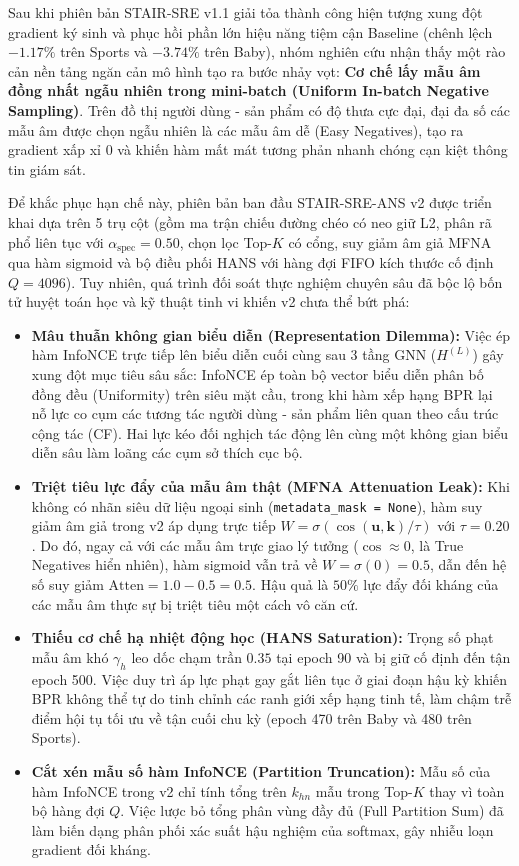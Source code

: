 Sau khi phiên bản STAIR-SRE v1.1 giải tỏa thành công hiện tượng xung đột gradient ký sinh và phục hồi phần lớn hiệu năng tiệm cận Baseline (chênh lệch $-1.17\%$ trên Sports và $-3.74\%$ trên Baby), nhóm nghiên cứu nhận thấy một rào cản nền tảng ngăn cản mô hình tạo ra bước nhảy vọt: \textbf{Cơ chế lấy mẫu âm đồng nhất ngẫu nhiên trong mini-batch (Uniform In-batch Negative Sampling)}. Trên đồ thị người dùng - sản phẩm có độ thưa cực đại, đại đa số các mẫu âm được chọn ngẫu nhiên là các mẫu âm dễ (Easy Negatives), tạo ra gradient xấp xỉ 0 và khiến hàm mất mát tương phản nhanh chóng cạn kiệt thông tin giám sát.

Để khắc phục hạn chế này, phiên bản ban đầu STAIR-SRE-ANS v2 được triển khai dựa trên 5 trụ cột (gồm ma trận chiếu đường chéo có neo giữ L2, phân rã phổ liên tục với $\alpha_{\text{spec}} = 0.50$, chọn lọc Top-$K$ có cổng, suy giảm âm giả MFNA qua hàm sigmoid và bộ điều phối HANS với hàng đợi FIFO kích thước cố định $Q=4096$). Tuy nhiên, quá trình đối soát thực nghiệm chuyên sâu đã bộc lộ bốn tử huyệt toán học và kỹ thuật tinh vi khiến v2 chưa thể bứt phá:

\begin{itemize}[leftmargin=*]
    \item \textbf{Mâu thuẫn không gian biểu diễn (Representation Dilemma):} Việc ép hàm InfoNCE trực tiếp lên biểu diễn cuối cùng sau 3 tầng GNN ($H^{(L)}$) gây xung đột mục tiêu sâu sắc: InfoNCE ép toàn bộ vector biểu diễn phân bố đồng đều (Uniformity) trên siêu mặt cầu, trong khi hàm xếp hạng BPR lại nỗ lực co cụm các tương tác người dùng - sản phẩm liên quan theo cấu trúc cộng tác (CF). Hai lực kéo đối nghịch tác động lên cùng một không gian biểu diễn sâu làm loãng các cụm sở thích cục bộ.
    \item \textbf{Triệt tiêu lực đẩy của mẫu âm thật (MFNA Attenuation Leak):} Khi không có nhãn siêu dữ liệu ngoại sinh (\texttt{metadata\_mask = None}), hàm suy giảm âm giả trong v2 áp dụng trực tiếp $W = \sigma(\cos(\mathbf{u}, \mathbf{k}) / \tau)$ với $\tau = 0.20$. Do đó, ngay cả với các mẫu âm trực giao lý tưởng ($\cos \approx 0$, là True Negatives hiển nhiên), hàm sigmoid vẫn trả về $W = \sigma(0) = 0.5$, dẫn đến hệ số suy giảm $\text{Atten} = 1.0 - 0.5 = 0.5$. Hậu quả là $50\%$ lực đẩy đối kháng của các mẫu âm thực sự bị triệt tiêu một cách vô căn cứ.
    \item \textbf{Thiếu cơ chế hạ nhiệt động học (HANS Saturation):} Trọng số phạt mẫu âm khó $\gamma_h$ leo dốc chạm trần $0.35$ tại epoch 90 và bị giữ cố định đến tận epoch 500. Việc duy trì áp lực phạt gay gắt liên tục ở giai đoạn hậu kỳ khiến BPR không thể tự do tinh chỉnh các ranh giới xếp hạng tinh tế, làm chậm trễ điểm hội tụ tối ưu về tận cuối chu kỳ (epoch 470 trên Baby và 480 trên Sports).
    \item \textbf{Cắt xén mẫu số hàm InfoNCE (Partition Truncation):} Mẫu số của hàm InfoNCE trong v2 chỉ tính tổng trên $k_{hn}$ mẫu trong Top-$K$ thay vì toàn bộ hàng đợi $Q$. Việc lược bỏ tổng phân vùng đầy đủ (Full Partition Sum) đã làm biến dạng phân phối xác suất hậu nghiệm của softmax, gây nhiễu loạn gradient đối kháng.
\end{itemize}

